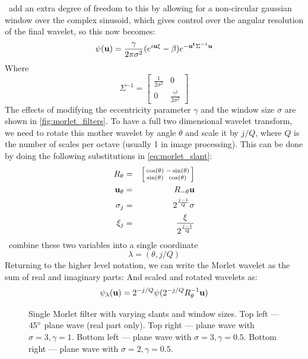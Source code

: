   \Mallat\ add an extra degree of freedom to this by allowing for a non-circular
  gaussian window over the complex sinusoid, which gives control over the angular
  resolution of the final wavelet, so this now becomes:
  \begin{equation}
    \psi(\mathbf{u}) = \frac{\gamma}{2\pi\sigma^2}{(e^{i\mathbf{u}\xi} - \beta)}
                  e^{-\mathbf{u^t}\Sigma^{-1}  \mathbf{u}} 
    \label{eq:morlet_slant}
  \end{equation}
  Where
  $$\Sigma^{-1} = \left[ \begin{smallmatrix} 
      \frac{1}{2\sigma^2} & 0 \\ 
      0 & \frac{\gamma^2}{2\sigma^2} 
      \end{smallmatrix} \right] $$
  The effects of modifying the eccentricity parameter $\gamma$ and the window size
  $\sigma$ are shown in \autoref{fig:morlet_filters}. To have a full two
  dimensional wavelet transform, we need to rotate this mother wavelet by angle
  $\theta$ and scale it by $j/Q$, where $Q$ is the number of scales per octave
  (usually 1 in image processing). 
  This can be done by doing the following
  substitutions in \autoref{eq:morlet_slant}:
  \begin{eqnarray*}
    R_{\theta}& = &\left[ \begin{smallmatrix}
                    \cos(\theta) & -\sin(\theta) \\
                    \sin(\theta) & \cos(\theta)
                  \end{smallmatrix} \right] \\
    \mathbf{u}_{\theta} & = & R_{-\theta} \mathbf{u} \\
    \sigma_j & = & 2^{\frac{j-1}{Q}} \sigma \\
    \xi_j & = & \frac{\xi}{2^{\frac{j-1}{Q}}}
  \end{eqnarray*}
  \Mallat\ combine these two variables into a single coordinate
  \begin{equation}
    \lambda = (\theta, j/Q)
  \end{equation}
  Returning to the higher level notation, we can write
  the Morlet wavelet as the sum of real and imaginary parts: And scaled and
  rotated wavelets as:
  \begin{equation}
    \psi_{\lambda}(\mathbf{u}) = 2^{-j/Q}\psi(2^{-j/Q}R_{\theta}^{-1} \mathbf{u})
  \end{equation}
  \begin{figure}
    \begin{center}
      \caption[Single Morlet filter with varying slants and window sizes]
              {Single Morlet filter with varying slants and window sizes. Top left ---
               $45{^{\circ}}$ plane wave (real part only). Top right --- plane wave
               with $\sigma=3,\gamma=1$. Bottom left --- plane wave with 
               $\sigma=3,\gamma=0.5$. Bottom right --- plane wave with 
               $\sigma=2,\gamma=0.5$.}
      \label{fig:morlet_filters}
    \end{center}
  \end{figure}


